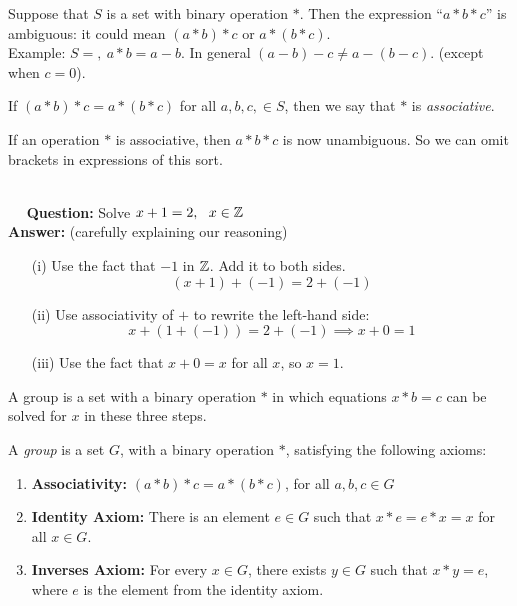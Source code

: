 Suppose that $S$ is a set with binary operation $*$. Then the expression ``$a * b * c$'' is ambiguous: it could mean $(a*b)*c$ or $a*(b*c)$.\\

 Example: $S = ,~ a*b =  a-b$. In general $(a-b)-c \neq a - (b-c)$. (except when $c = 0$).\\



\begin{definition} If $(a*b)*c = a*(b*c)$ for all $a,b,c, \in S$, then we say that $*$ is \emph{associative}.	
\end{definition}\vspace*{10pt}


If an operation $*$ is associative, then $a*b*c$ is now unambiguous. So we can omit brackets in expressions of this sort.\\


\begin{example} \\
 ~~ \textbf{Question:} Solve $x + 1 = 2, ~~ x \in \mathbb{Z}$\\
 
\textbf{Answer:} (carefully explaining our reasoning) \begin{enumerate}
 \item[(i)] Use the fact that $-1$ in $\mathbb{Z}$. Add it to both sides.
 \[(x+1) + (-1) =  2 + (-1)\]
 \item[(ii)] Use associativity of $+$ to rewrite the left-hand side:
 \[x + (1 + (-1)) = 2 + (-1) \implies x + 0 = 1\]
 \item[(iii)] Use the fact that $x + 0 = x$ for all $x$, so $x = 1$.
 \end{enumerate}
 \end{example}

A group is a set with a binary operation $*$ in which equations $x * b = c$ can be solved for $x$ in these three steps.\\

\begin{definition} A \emph{group} is a set $G$, with a binary operation $*$, satisfying the following axioms:\begin{enumerate}
\item \textbf{Associativity:} $(a*b)*c = a*(b*c)$, for all $a,b,c \in G$
\item \textbf{Identity Axiom:} There is an element $e \in G$ such that $x * e = e*x = x$ for all $x \in G$.
\item \textbf{Inverses Axiom:} For every $x \in G$, there exists $y \in G$ such that $x * y = e$, where $e$ is the element from the identity axiom.
\end{enumerate}
\end{definition}

